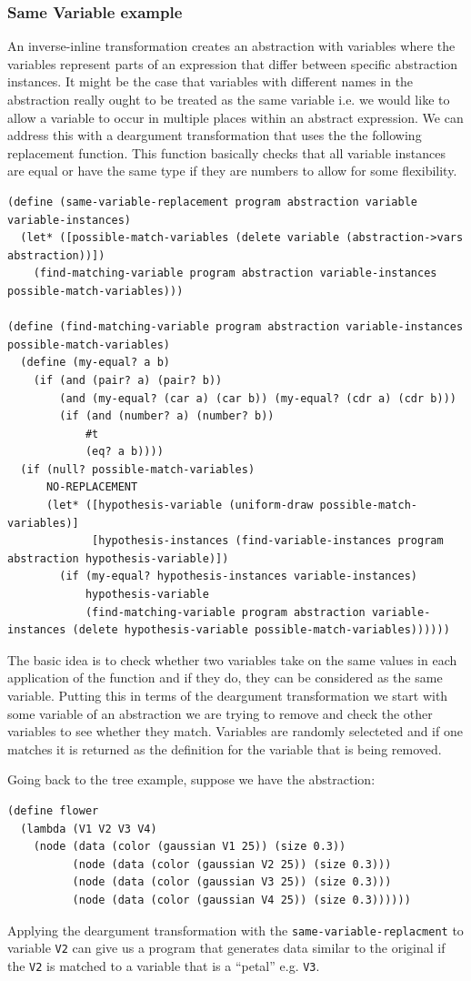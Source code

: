 \documentclass[a4paper,10pt]{article}
\begin{document}
\subsubsection{Same Variable example}
An inverse-inline transformation creates an abstraction with variables where the variables represent parts of an expression that differ between specific abstraction instances.  It might be the case that variables with different names in the abstraction really ought to be treated as the same variable i.e. we would like to allow a variable to occur in multiple places within an abstract expression.  We can address this with a deargument transformation that uses the the following replacement function.  This function basically checks that all variable instances are equal or have the same type if they are numbers to allow for some flexibility.
\begin{lstlisting}[frame=trBL]
(define (same-variable-replacement program abstraction variable variable-instances)
  (let* ([possible-match-variables (delete variable (abstraction->vars abstraction))])
    (find-matching-variable program abstraction variable-instances possible-match-variables)))

(define (find-matching-variable program abstraction variable-instances possible-match-variables)
  (define (my-equal? a b) 
    (if (and (pair? a) (pair? b)) 
        (and (my-equal? (car a) (car b)) (my-equal? (cdr a) (cdr b))) 
        (if (and (number? a) (number? b))
            #t
            (eq? a b)))) 
  (if (null? possible-match-variables)
      NO-REPLACEMENT
      (let* ([hypothesis-variable (uniform-draw possible-match-variables)]
             [hypothesis-instances (find-variable-instances program abstraction hypothesis-variable)])
        (if (my-equal? hypothesis-instances variable-instances)
            hypothesis-variable
            (find-matching-variable program abstraction variable-instances (delete hypothesis-variable possible-match-variables))))))
\end{lstlisting}
The basic idea is to check whether two variables take on the same values in each application of the function and if they do, they can be considered as the same variable.  Putting this in terms of the deargument transformation we start with some variable of an abstraction we are trying to remove and check the other variables to see whether they match.  Variables are randomly selecteted and if one matches it is returned as the definition for the variable that is being removed.  

Going back to the tree example, suppose we have the abstraction:
\begin{lstlisting}
(define flower
  (lambda (V1 V2 V3 V4)
    (node (data (color (gaussian V1 25)) (size 0.3))
          (node (data (color (gaussian V2 25)) (size 0.3)))
          (node (data (color (gaussian V3 25)) (size 0.3)))
          (node (data (color (gaussian V4 25)) (size 0.3))))))
\end{lstlisting}
Applying the deargument transformation with the \texttt{same-variable-replacment} to variable \texttt{V2} can give us a program that generates data similar to the original if the \texttt{V2} is matched to a variable that is a ``petal'' e.g. \texttt{V3}.
\end{document}
